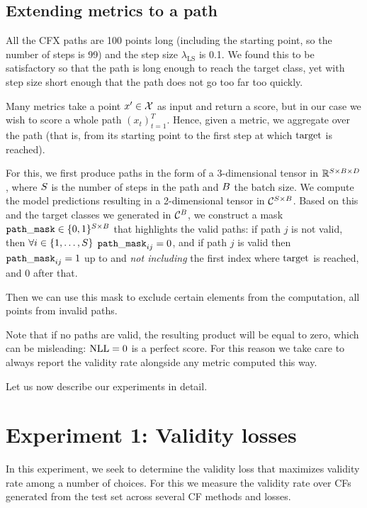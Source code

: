 \documentclass[../main.tex]{subfiles}
\begin{document}
\subsection{Extending metrics to a path}
\label{exp/masking}

All the CFX paths are 100 points long (including the starting point, so the number of steps is 99) and the step size $\lambda_\text{LS}$ is 0.1. We found this to be satisfactory so that the path is long enough to reach the target class, yet with step size short enough that the path does not go too far too quickly.

Many metrics take a point $x' \in \mathcal{X}$ as input and return a score, but in our case we wish to score a whole path $(x_t)_{t=1}^T$.
Hence, given a metric, we aggregate over the path (that is, from its starting point to the first step at which $\mathrm{target}$ is reached).

For this, we first produce paths in the form of a 3-dimensional tensor in $\mathbb{R}^{S \times B \times D}$,
where $S$ is the number of steps in the path and $B$ the batch size.
We compute the model predictions resulting in a 2-dimensional tensor in $\mathcal{C}^{S \times B}$.
Based on this and the target classes we generated in $\mathcal{C}^B$, we construct a mask $\mathtt{path\_mask} \in \{0, 1\}^{S \times B}$ that highlights the valid paths:
if path $j$ is not valid, then
$\forall i \in \{1, \ldots, S\}$ ${\mathtt{path\_mask}_{ij} = 0}$, and if path $j$ is valid then $\mathtt{path\_mask}_{ij} = 1$ up to and \emph{not including} the first index where $\mathrm{target}$ is reached, and 0 after that.

Then we can use this mask to exclude certain elements from the computation, \eg{} all points from invalid paths.

Note that if no paths are valid, the resulting product will be equal to zero, which can be misleading: $\text{NLL} = 0$ is a perfect score.
For this reason we take care to always report the validity rate alongside any metric computed this way.

Let us now describe our experiments in detail.

\section{Experiment 1: Validity losses}

In this experiment, we seek to determine the validity loss that maximizes validity rate among a number of choices.
For this we measure the validity rate over CFs generated from the test set across several CF methods and losses.
\end{document}

